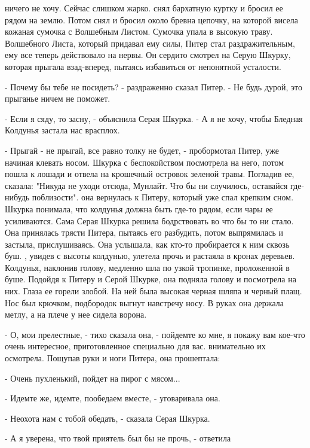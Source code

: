ничего не хочу. Сейчас слишком жарко.
 снял бархатную куртку и бросил ее рядом на землю. Потом снял и 
бросил около бревна цепочку, на которой висела кожаная сумочка с 
Волшебным Листом. Сумочка упала в высокую траву.
 Волшебного Листа, который придавал ему силы, Питер стал 
раздражительным, ему все теперь действовало на нервы. Он сердито 
смотрел на Серую Шкурку, которая прыгала взад-вперед, пытаясь 
избавиться от непонятной усталости.
\par- Почему бы тебе не посидеть? - раздраженно сказал Питер. - Не 
будь дурой, это прыганье ничем не поможет.
\par- Если я сяду, то засну, - объяснила Серая Шкурка. - А я не хочу, 
чтобы Бледная Колдунья застала нас врасплох.
\par- Прыгай - не прыгай, все равно толку не будет, - пробормотал 
Питер, уже начиная клевать носом.
 Шкурка с беспокойством посмотрела на него, потом пошла к 
лошади и отвела на крошечный островок зеленой травы. Погладив ее, 
сказала: "Никуда не уходи отсюда, Мунлайт. Что бы ни случилось, 
оставайся где-нибудь поблизости".
 она вернулась к Питеру, который уже спал крепким сном.
 Шкурка понимала, что колдунья должна быть где-то рядом, если 
чары ее усиливаются. Сама Серая Шкурка решила бодрствовать во что бы 
то ни стало. Она принялась трясти Питера, пытаясь его разбудить, потом 
выпрямилась и застыла, прислушиваясь. Она услышала, как кто-то 
пробирается к ним сквозь буш.
, увидев с высоты колдунью, улетела прочь и растаяла в 
кронах деревьев. Колдунья, наклонив голову, медленно шла по узкой 
тропинке, проложенной в буше. Подойдя к Питеру и Серой Шкурке, она 
подняла голову и посмотрела на них. Глаза ее горели злобой. На ней 
была высокая черная шляпа и черный плащ. Нос был крючком, подбородок 
выгнут навстречу носу. В руках она держала метлу, а на плече у нее 
сидела ворона.
\par- О, мои прелестные, - тихо сказала она, - пойдемте ко мне, я 
покажу вам кое-что очень интересное, приготовленное специально для 
вас.
 внимательно их осмотрела. Пощупав руки и ноги Питера, она 
прошептала:
\par- Очень пухленький, пойдет на пирог с мясом...
\par- Идемте же, идемте, пообедаем вместе, - уговаривала она.
\par- Неохота нам с тобой обедать, - сказала Серая Шкурка.
\par- А я уверена, что твой приятель был бы не прочь, - ответила 

